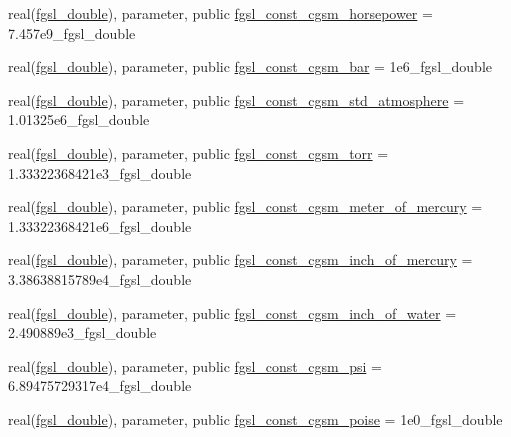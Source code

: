 \begin{DoxyCompactItemize}
\item 
real(\hyperlink{namespacefgsl_a9af5113378e0f000eb479d3f90196ddf}{fgsl\+\_\+double}), parameter, public \hyperlink{namespacefgsl_a42cd4b78f557f4774c2542bb74f48dfb}{fgsl\+\_\+const\+\_\+cgsm\+\_\+horsepower} = 7.\+457e9\+\_\+fgsl\+\_\+double
\item 
real(\hyperlink{namespacefgsl_a9af5113378e0f000eb479d3f90196ddf}{fgsl\+\_\+double}), parameter, public \hyperlink{namespacefgsl_a324807e6ca282345460f8918fc39f07f}{fgsl\+\_\+const\+\_\+cgsm\+\_\+bar} = 1e6\+\_\+fgsl\+\_\+double
\item 
real(\hyperlink{namespacefgsl_a9af5113378e0f000eb479d3f90196ddf}{fgsl\+\_\+double}), parameter, public \hyperlink{namespacefgsl_a3da30a3dd34b8f19a5e653e57f41f360}{fgsl\+\_\+const\+\_\+cgsm\+\_\+std\+\_\+atmosphere} = 1.\+01325e6\+\_\+fgsl\+\_\+double
\item 
real(\hyperlink{namespacefgsl_a9af5113378e0f000eb479d3f90196ddf}{fgsl\+\_\+double}), parameter, public \hyperlink{namespacefgsl_a94ff1d0989beeed6065313b2a63530cb}{fgsl\+\_\+const\+\_\+cgsm\+\_\+torr} = 1.\+33322368421e3\+\_\+fgsl\+\_\+double
\item 
real(\hyperlink{namespacefgsl_a9af5113378e0f000eb479d3f90196ddf}{fgsl\+\_\+double}), parameter, public \hyperlink{namespacefgsl_aa8fef1711fbb6768c4d9f7061e85b117}{fgsl\+\_\+const\+\_\+cgsm\+\_\+meter\+\_\+of\+\_\+mercury} = 1.\+33322368421e6\+\_\+fgsl\+\_\+double
\item 
real(\hyperlink{namespacefgsl_a9af5113378e0f000eb479d3f90196ddf}{fgsl\+\_\+double}), parameter, public \hyperlink{namespacefgsl_a3cedc29e68dc7bfeb7a43c07d1496c6e}{fgsl\+\_\+const\+\_\+cgsm\+\_\+inch\+\_\+of\+\_\+mercury} = 3.\+38638815789e4\+\_\+fgsl\+\_\+double
\item 
real(\hyperlink{namespacefgsl_a9af5113378e0f000eb479d3f90196ddf}{fgsl\+\_\+double}), parameter, public \hyperlink{namespacefgsl_ae3e9d91a0883033afa45f2237810a306}{fgsl\+\_\+const\+\_\+cgsm\+\_\+inch\+\_\+of\+\_\+water} = 2.\+490889e3\+\_\+fgsl\+\_\+double
\item 
real(\hyperlink{namespacefgsl_a9af5113378e0f000eb479d3f90196ddf}{fgsl\+\_\+double}), parameter, public \hyperlink{namespacefgsl_adbc0f817c0f6ab5ff3cb517430c2a28f}{fgsl\+\_\+const\+\_\+cgsm\+\_\+psi} = 6.\+89475729317e4\+\_\+fgsl\+\_\+double
\item 
real(\hyperlink{namespacefgsl_a9af5113378e0f000eb479d3f90196ddf}{fgsl\+\_\+double}), parameter, public \hyperlink{namespacefgsl_ac2108186e2fec1e447f96ad1ab30ae23}{fgsl\+\_\+const\+\_\+cgsm\+\_\+poise} = 1e0\+\_\+fgsl\+\_\+double

\end{DoxyCompactItemize}
